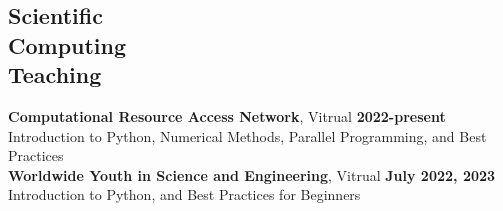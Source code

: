 \documentclass[margin,line]{resume}
\begin{document}
\begin{resume}

    \section{\mysidestyle Scientific\\Computing\\Teaching}
    \textbf{Computational Resource Access Network}, Vitrual \hfill \textbf{2022-present}\\
    Introduction to Python, Numerical Methods, Parallel Programming, and Best Practices \\
    \textbf{Worldwide Youth in Science and Engineering}, Vitrual \hfill \textbf{July 2022, 2023}\\
    Introduction to Python, and Best Practices for Beginners
                \vspace{2mm}\\



\end{resume}
\end{document}
